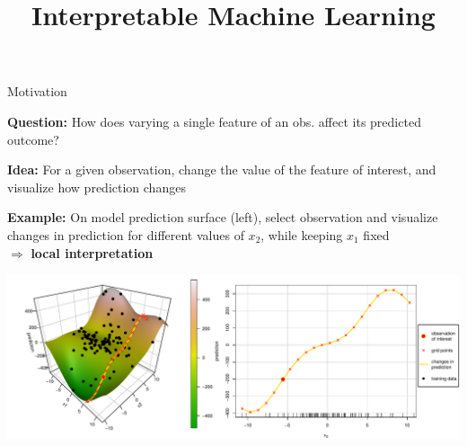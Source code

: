 \documentclass[10pt,compress,t,notes=noshow, xcolor=table]{beamer}
\title{Interpretable Machine Learning}
\date{}
\begin{document}



\begin{frame}{Motivation}

\textbf{Question:} How does varying a single feature of an obs. affect its predicted outcome?

\smallskip

\textbf{Idea:} For a given observation, change the value of the feature of interest, and visualize how prediction changes

\smallskip

\textbf{Example:} On model prediction surface (left), select observation and visualize changes in prediction for different values of $x_2$, while keeping $x_1$ fixed \\ $\Rightarrow$ \textbf{local interpretation}

\bigskip
\centering
\includegraphics[width=\textwidth]{figure/ice_motivation}

\end{frame}
\end{document}
